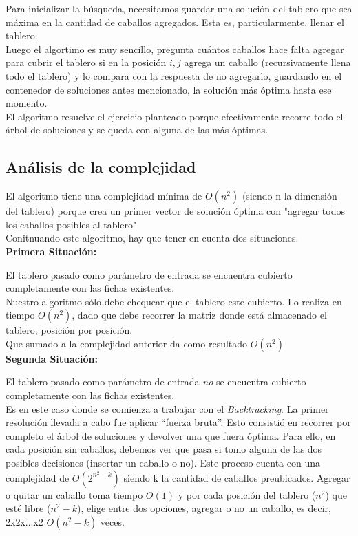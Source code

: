 Para inicializar la b\'usqueda, necesitamos guardar una soluci\'on del tablero que sea m\'axima en la cantidad de caballos agregados. Esta es, particularmente, llenar el tablero.\\

Luego el algortimo es muy sencillo, pregunta cu\'antos caballos hace falta agregar para cubrir el tablero si en la posici\'on $i, j$ agrega un caballo (recursivamente llena todo el tablero) y lo compara con la respuesta de no agregarlo, guardando en el contenedor de soluciones antes mencionado, la soluci\'on m\'as \'optima hasta ese momento.\\

El algoritmo resuelve el ejercicio planteado porque efectivamente recorre todo el \'arbol de soluciones y se queda con alguna de las m\'as \'optimas.\\

\newpage

\subsection{An\'alisis de la complejidad}
El algoritmo tiene una complejidad m\'inima de $O(n^{2})$ (siendo n la dimensi\'on del tablero) porque crea un primer vector de soluci\'on \'optima con "agregar todos los caballos posibles al tablero"\\

Conitnuando este algoritmo, hay que tener en cuenta dos situaciones.\\

\textbf{Primera Situaci\'on: }

El tablero pasado como par\'ametro de entrada se encuentra cubierto completamente con las fichas existentes.\\

Nuestro algoritmo s\'olo debe chequear que el tablero este cubierto. Lo realiza en tiempo $O(n^{2})$, dado que debe recorrer la matriz donde est\'a almacenado el tablero, posici\'on por posici\'on.\\

Que sumado a la complejidad anterior da como resultado $O(n^{2})$\\

\textbf{Segunda Situaci\'on: }

El tablero pasado como par\'ametro de entrada \emph{no} se encuentra cubierto completamente con las fichas existentes.\\

Es en este caso donde se comienza a trabajar con el \emph{Backtracking}. La primer resoluci\'on llevada a cabo fue aplicar ``fuerza bruta''. Esto consisti\'o en recorrer por completo el \'arbol de soluciones y devolver una que fuera \'optima. Para ello, en cada posici\'on sin caballos, debemos ver que pasa si tomo alguna de las dos posibles decisiones (insertar un caballo o no). Este proceso cuenta con una complejidad de $O(2^{n^{2} - k})$ siendo k la cantidad de caballos preubicados. Agregar o quitar un caballo toma tiempo $O(1)$ y por cada posici\'on del tablero ($n^{2}$) que est\'e libre ($n^{2} - k$), elige entre dos opciones, agregar o no un caballo, es decir, 2x2x...x2 $O(n^{2}-k)$ veces.\\

